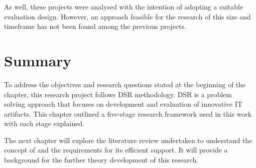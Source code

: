 As well, these projects were analysed with the intention of adopting a suitable
evaluation design. However, an approach feasible for the research of this size
and timeframe has not been found among the previous projects.

\section{Summary}

To address the objectives and research questions stated at the beginning of the
chapter, this research project follows DSR methodology. DSR is a problem solving
approach that focuses on development and evaluation of innovative IT artifacts.
This chapter outlined a five-stage research framework used in this work with
each stage explained.

The next chapter will explore the literature review undertaken to understand the
concept of \LLLs and the requirements for its efficient support. It will provide
a background for the further theory development of this research.

